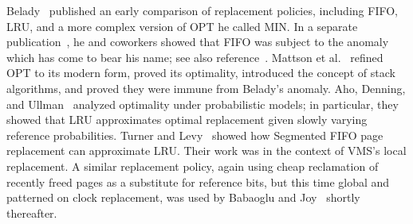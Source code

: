 Belady~\cite{max1072} published an early comparison of replacement
policies, including FIFO, LRU, and a more complex version of OPT he
called MIN.  In a separate publication~\cite{max1029}, he and
coworkers showed that
FIFO was subject to the anomaly which has come to bear his name; see
also reference~\cite{max1030}.  Mattson et al.~\cite{max1073} refined
OPT to its modern form, proved its optimality, introduced the concept
of stack algorithms, and proved they were immune from Belady's
anomaly.  Aho, Denning,
and Ullman~\cite{max1031} analyzed optimality
under probabilistic models; in particular, they showed that LRU
approximates optimal replacement given slowly varying reference
probabilities.  Turner and Levy~\cite{max1075} showed how Segmented
FIFO page replacement can approximate LRU.  Their work was in the context
of VMS's local replacement.  A similar replacement policy, again using
cheap reclamation of recently freed pages as a substitute for
reference bits, but this time global and patterned on clock replacement, was used
by Babaoglu and
Joy~\cite{max1074} shortly thereafter.
